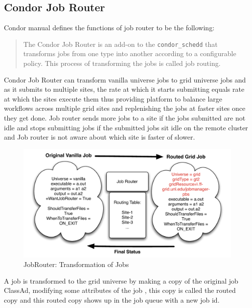 \documentclass[ms,electronic,double]{nuthesis}
\begin{document}
\subsection{Condor Job Router}

Condor manual defines the functions of job router to be the following:
\begin{quotation}

The Condor Job Router is an add-on to the \texttt{condor\_schedd} that transforms jobs from one type into 
another according to a configurable policy\cite{manual56}. 
This process of transforming the jobs is called job routing.
\end{quotation}

Condor Job Router can transform vanilla universe jobs to grid universe jobs and 
as it submits to multiple sites, the rate at which it starts submitting equals 
rate at which the sites execute them thus providing platform to balance large 
workflows across multiple grid sites and replenishing the jobs at
faster sites once they get done. Job router sends more jobs to a site if 
the jobs submitted are not idle and stops submitting jobs if the submitted jobs 
sit idle on the remote cluster and Job router is not aware about which site is 
faster of slower.


\begin{figure}[htbp!]
\begin{center}
\includegraphics[scale=0.75]{images/jobRouter}
\caption{JobRouter: Transformation of Jobs}
\label{fig:JobRouter}
\end{center}
\end{figure}

A job is transformed to the grid universe by making a copy of the original job 
ClassAd, modifying some attributes of the job , this copy is called the routed 
copy and this routed copy shows up in the job queue with a new job id\cite{manual56}.
\end{document}
